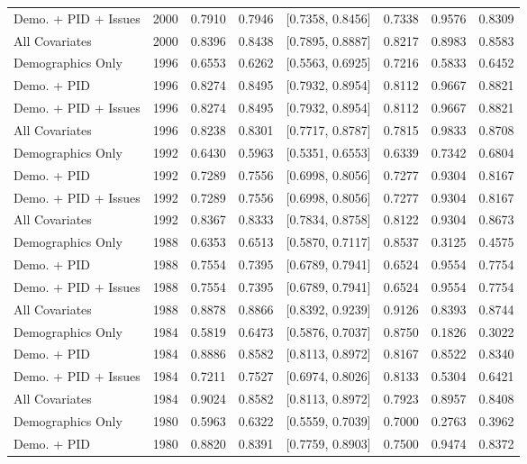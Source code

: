 \begin{longtable}{lrrrlrrr}
  Demo. + PID + Issues & 2000 & 0.7910 & 0.7946 & [0.7358, 0.8456] & 0.7338 & 0.9576 & 0.8309 \\ 
  All Covariates & 2000 & 0.8396 & 0.8438 & [0.7895, 0.8887] & 0.8217 & 0.8983 & 0.8583 \\ 
  Demographics Only & 1996 & 0.6553 & 0.6262 & [0.5563, 0.6925] & 0.7216 & 0.5833 & 0.6452 \\ 
  Demo. + PID & 1996 & 0.8274 & 0.8495 & [0.7932, 0.8954] & 0.8112 & 0.9667 & 0.8821 \\ 
  Demo. + PID + Issues & 1996 & 0.8274 & 0.8495 & [0.7932, 0.8954] & 0.8112 & 0.9667 & 0.8821 \\ 
  All Covariates & 1996 & 0.8238 & 0.8301 & [0.7717, 0.8787] & 0.7815 & 0.9833 & 0.8708 \\ 
  Demographics Only & 1992 & 0.6430 & 0.5963 & [0.5351, 0.6553] & 0.6339 & 0.7342 & 0.6804 \\ 
  Demo. + PID & 1992 & 0.7289 & 0.7556 & [0.6998, 0.8056] & 0.7277 & 0.9304 & 0.8167 \\ 
  Demo. + PID + Issues & 1992 & 0.7289 & 0.7556 & [0.6998, 0.8056] & 0.7277 & 0.9304 & 0.8167 \\ 
  All Covariates & 1992 & 0.8367 & 0.8333 & [0.7834, 0.8758] & 0.8122 & 0.9304 & 0.8673 \\ 
  Demographics Only & 1988 & 0.6353 & 0.6513 & [0.5870, 0.7117] & 0.8537 & 0.3125 & 0.4575 \\ 
  Demo. + PID & 1988 & 0.7554 & 0.7395 & [0.6789, 0.7941] & 0.6524 & 0.9554 & 0.7754 \\ 
  Demo. + PID + Issues & 1988 & 0.7554 & 0.7395 & [0.6789, 0.7941] & 0.6524 & 0.9554 & 0.7754 \\ 
  All Covariates & 1988 & 0.8878 & 0.8866 & [0.8392, 0.9239] & 0.9126 & 0.8393 & 0.8744 \\ 
  Demographics Only & 1984 & 0.5819 & 0.6473 & [0.5876, 0.7037] & 0.8750 & 0.1826 & 0.3022 \\ 
  Demo. + PID & 1984 & 0.8886 & 0.8582 & [0.8113, 0.8972] & 0.8167 & 0.8522 & 0.8340 \\ 
  Demo. + PID + Issues & 1984 & 0.7211 & 0.7527 & [0.6974, 0.8026] & 0.8133 & 0.5304 & 0.6421 \\ 
  All Covariates & 1984 & 0.9024 & 0.8582 & [0.8113, 0.8972] & 0.7923 & 0.8957 & 0.8408 \\ 
  Demographics Only & 1980 & 0.5963 & 0.6322 & [0.5559, 0.7039] & 0.7000 & 0.2763 & 0.3962 \\ 
  Demo. + PID & 1980 & 0.8820 & 0.8391 & [0.7759, 0.8903] & 0.7500 & 0.9474 & 0.8372 \\ 

\end{longtable}

